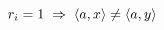 \documentclass[preview]{standalone}
\begin{document}
\begin{center}
$r_i=1 \hspace{0.1cm}\Rightarrow\hspace{0.1cm} \langle a, x\rangle \neq \langle a,y \rangle $
\end{center}
\end{document}
